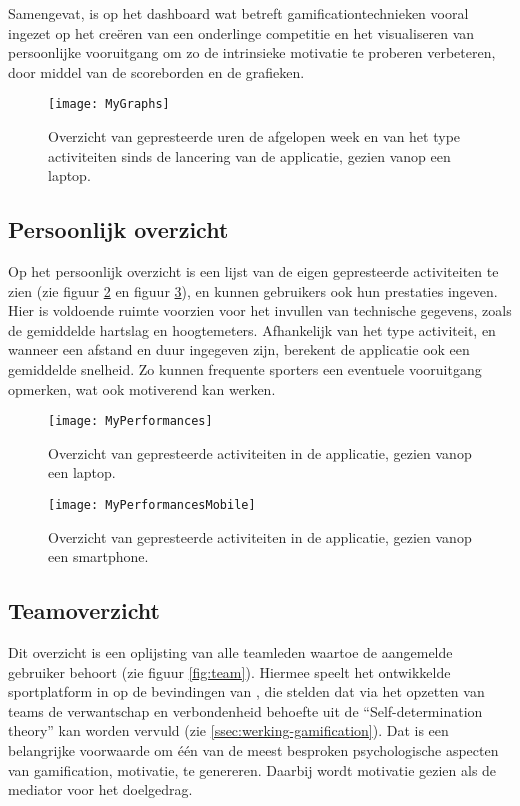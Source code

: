 Samengevat, is op het dashboard wat betreft gamificationtechnieken vooral ingezet op het creëren van een onderlinge competitie en het visualiseren van persoonlijke vooruitgang om zo de intrinsieke motivatie te proberen verbeteren, door middel van de scoreborden en de grafieken.

\begin{figure}[h]
    \caption[Overzicht prestaties dashboard website]{Overzicht van gepresteerde uren de afgelopen week en van het type activiteiten sinds de lancering van de applicatie, gezien vanop een laptop.}
    \texttt{[image: MyGraphs]}
    \label{fig:graphs}
\end{figure}

\subsection{Persoonlijk overzicht}
Op het persoonlijk overzicht is een lijst van de eigen gepresteerde activiteiten te zien (zie figuur \ref{fig:performances} en figuur \ref{fig:performancesMobile}), en kunnen gebruikers ook hun prestaties ingeven. Hier is voldoende ruimte voorzien voor het invullen van technische gegevens, zoals de gemiddelde hartslag en hoogtemeters. Afhankelijk van het type activiteit, en wanneer een afstand en duur ingegeven zijn, berekent de applicatie ook een gemiddelde snelheid. Zo kunnen frequente sporters een eventuele vooruitgang opmerken, wat ook motiverend kan werken.

\begin{figure}[h]
    \caption[Overzicht activiteiten website]{Overzicht van gepresteerde activiteiten in de applicatie, gezien vanop een laptop.}
    \texttt{[image: MyPerformances]}
    \label{fig:performances}
\end{figure}

\begin{figure}[h]
    \caption[Overzicht activiteiten website smartphone]{Overzicht van gepresteerde activiteiten in de applicatie, gezien vanop een smartphone.}
    \texttt{[image: MyPerformancesMobile]}
    \label{fig:performancesMobile}
\end{figure}

\subsection{Teamoverzicht}

Dit overzicht is een oplijsting van alle teamleden waartoe de aangemelde gebruiker behoort (zie figuur \ref{fig:team}). Hiermee speelt het ontwikkelde sportplatform in op de bevindingen van \textcite{Kam2018}, die stelden dat via het opzetten van teams de verwantschap en verbondenheid behoefte uit de “Self-determination theory” kan worden vervuld  (zie \ref{ssec:werking-gamification}). Dat is een belangrijke voorwaarde om één van de meest besproken psychologische aspecten van gamification, motivatie, te genereren. Daarbij wordt motivatie gezien als de mediator voor het doelgedrag.

